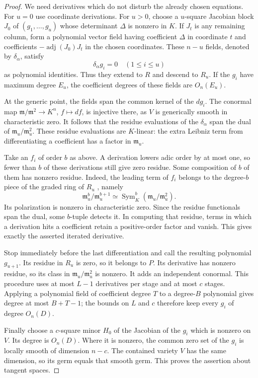 \begin{proof}
We need derivatives which do not disturb the already chosen equations. For $u=0$ use coordinate derivations.  For $u>0$, choose a $u$-square Jacobian block $J_0$ of $(g_1,\ldots,g_u)$ whose determinant $\Delta$ is nonzero in $K$.  If $J_t$ is any remaining column, form a polynomial vector field having coefficient $\Delta$ in coordinate $t$ and coefficients $-\operatorname{adj}(J_0)J_t$ in the chosen coordinates. These $n-u$ fields, denoted by $\delta_\alpha$, satisfy
\[
 \delta_\alpha g_i=0\quad(1\leq i\leq u)
\]
as polynomial identities.  Thus they extend to $R$ and descend to $R_u$.  If the $g_i$ have maximum degree $E_u$, the coefficient degrees of these fields are $O_n(E_u)$.

At the generic point, the fields span the common kernel of the $d g_i$.  The conormal map $\mathfrak{m}/\mathfrak{m}^2\to K^n$, $f\mapsto df$, is injective there, as $V$ is generically smooth in characteristic zero.  It follows that the residue evaluations of the $\delta_\alpha$ span the dual of $\mathfrak{m}_u/\mathfrak{m}_u^2$.  These residue evaluations are $K$-linear: the extra Leibniz term from differentiating a coefficient has a factor in $\mathfrak{m}_u$.

Take an $f_i$ of order $b$ as above.  A derivation lowers adic order by at most one, so fewer than $b$ of these derivations still give zero residue.  Some composition of $b$ of them has nonzero residue.  Indeed, the leading term of $f_i$ belongs to the degree-$b$ piece of the graded ring of $R_u$ \cite[Tag~00NO]{stacksproject}, namely
\[
 \mathfrak{m}_u^b/\mathfrak{m}_u^{b+1}
 \simeq\operatorname{Sym}^b_K(\mathfrak{m}_u/\mathfrak{m}_u^2).
\]
Its polarization is nonzero in characteristic zero.  Since the residue functionals span the dual, some $b$-tuple detects it.  In computing that residue, terms in which a derivation hits a coefficient retain a positive-order factor and vanish.  This gives exactly the asserted iterated derivative.

Stop immediately before the last differentiation and call the resulting polynomial $g_{u+1}$.  Its residue in $R_u$ is zero, so it belongs to $P$.  Its derivative has nonzero residue, so its class in $\mathfrak{m}_u/\mathfrak{m}_u^2$ is nonzero.  It adds an independent conormal.  This procedure uses at most $L-1$ derivatives per stage and at most $c$ stages.  Applying a polynomial field of coefficient degree $T$ to a degree-$B$ polynomial gives degree at most $B+T-1$; the bounds on $L$ and $c$ therefore keep every $g_i$ of degree $O_n(D)$.

Finally choose a $c$-square minor $H_0$ of the Jacobian of the $g_i$ which is nonzero on $V$.  Its degree is $O_n(D)$.  Where it is nonzero, the common zero set of the $g_i$ is locally smooth of dimension $n-c$. The contained variety $V$ has the same dimension, so its germ equals that smooth germ.  This proves the assertion about tangent spaces.
\end{proof}


